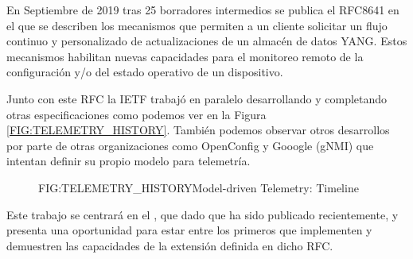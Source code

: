 En Septiembre de 2019 tras 25 borradores intermedios se publica el \gls{RFC}8641 en el que se describen los mecanismos que permiten a un cliente solicitar un flujo continuo y personalizado de actualizaciones de un almacén de datos YANG. Estos mecanismos habilitan nuevas capacidades para el monitoreo remoto de la configuración y/o del estado operativo de un dispositivo\cite{RFC8641}.

Junto con este \gls{RFC} la \gls{IETF} trabajó en paralelo desarrollando y completando otras especificaciones como podemos ver en la Figura \ref{FIG:TELEMETRY_HISTORY}. También podemos observar otros desarrollos por parte de otras organizaciones como OpenConfig y Gooogle (gNMI) que intentan definir su propio modelo para telemetría.


\begin{figure}[Model-driven Telemetry: Timeline]{FIG:TELEMETRY_HISTORY}{Model-driven Telemetry: Timeline}
\end{figure}



Este trabajo se centrará en el \cite{RFC8641}, que dado que ha sido publicado recientemente, y presenta una oportunidad para estar entre los primeros que implementen y demuestren las capacidades de la extensión definida en dicho \gls{RFC}.